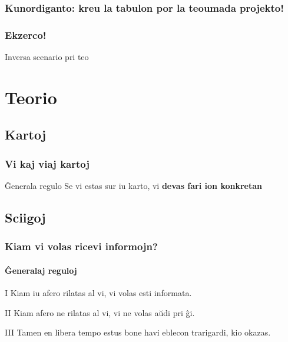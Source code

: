 \documentclass{beamer}
\begin{document}
  \begin{frame}
    \frametitle{Kunordiganto: kreu la tabulon por la teoumada projekto!}
    
  \end{frame}

  \begin{frame}
    \frametitle{Ekzerco!}

    Inversa scenario pri teo
  \end{frame}

\section{Teorio}

\subsection{Kartoj}
  \begin{frame}
    \frametitle{Vi kaj viaj kartoj}

	\begin{block}{Ĝenerala regulo}
		Se vi estas sur iu karto, vi \textbf{devas fari ion konkretan}
	\end{block}
  \end{frame}


\subsection{Sciigoj}
  \begin{frame}
    \frametitle{Kiam vi volas ricevi informojn?}
	\framesubtitle{Ĝeneralaj reguloj}
	\begin{block}{I}
		Kiam iu afero rilatas al vi, vi volas esti informata.
	\end{block}
	\begin{block}{II}
		Kiam afero ne rilatas al vi, vi ne volas aŭdi pri ĝi.
	\end{block}
	\begin{block}{III}
		Tamen en libera tempo estus bone havi eblecon trarigardi, kio okazas.
	\end{block}
	
  \end{frame}
\end{document}
